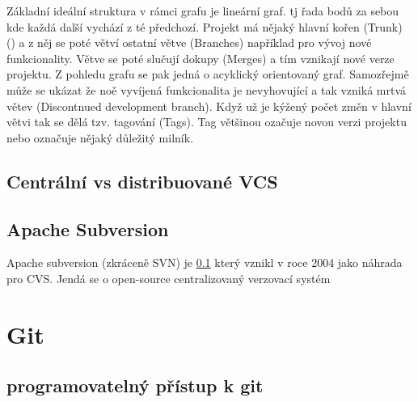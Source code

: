 Základní ideální struktura v rámci grafu je lineární graf. tj řada bodů za sebou kde každá další vychází z té předchozí.
Projekt má nějaký hlavní kořen (Trunk) () a z něj se poté větví ostatní větve (Branches) například pro vývoj nové funkcionality. Větve se poté slučují dokupy (Merges) a tím vznikají nové verze projektu. Z pohledu grafu se pak jedná o acyklický orientovaný graf. Samozřejmě může se ukázat že noě vyvíjená funkcionalita je nevyhovující a tak vzniká mrtvá větev (Discontnued development branch). Když už je kýžený počet změn v hlavní větvi tak se dělá tzv. tagování (Tags). Tag většinou ozačuje novou verzi projektu nebo označuje nějaký důležitý milník.

\subsection{Centrální vs distribuované VCS}
\label{sec:vcs}


\subsection{Apache Subversion}
\label{sec:svn}
Apache subversion (zkráceně SVN) je \ref{sec:vcs} který vznikl v roce 2004 jako náhrada pro CVS. Jendá se o open-source centralizovaný verzovací systém 


\section{Git}


\subsection{programovatelný přístup k git}

\endinput